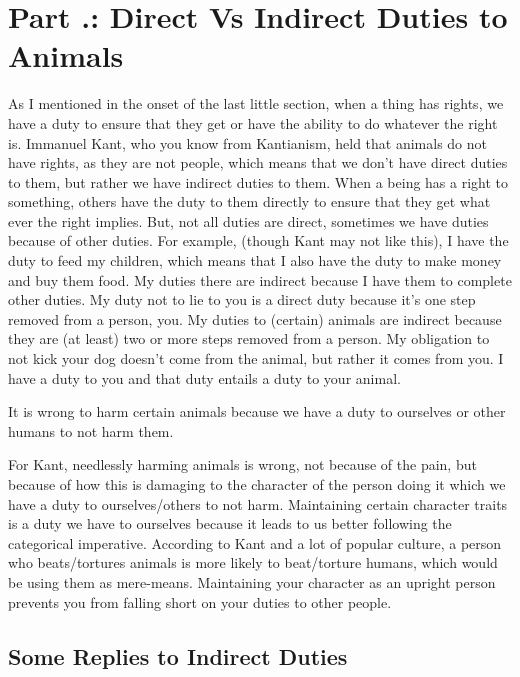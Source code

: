 \section{Part \thechapcount.\theseccount: Direct Vs Indirect Duties to Animals}
As I mentioned in the onset of the last little section, when a thing has rights, we have a duty to ensure that they get or have the ability to do whatever the right is. Immanuel Kant, who you know from Kantianism, held that animals do not have rights, as they are not people, which means that we don't have direct duties to them, but rather we have indirect duties to them. When a being has a right to something, others have the duty to them directly  to ensure that they get what ever the right implies. But, not all duties are direct, sometimes we have duties because of other duties. For example, (though Kant may not like this), I have the duty to feed my children, which means that I also have the duty to make money and buy them food. My duties there are indirect because I have them to complete other duties. My duty not to lie to you is a direct duty because it's one step removed from a person, you. My duties to (certain) animals are indirect because they are (at least) two or more steps removed from a person. My obligation to not kick your dog doesn't come from the animal, but rather it comes from you. I have a duty to you and that duty entails a duty to your animal. 

\begin{center}It is wrong to harm certain animals because we have a duty to ourselves or other humans to not harm them.\end{center}

For Kant, needlessly harming animals is wrong, not because of the pain, but because of how this is damaging to the character of the person doing it which we have a duty to ourselves/others to not harm. Maintaining certain character traits is a duty we have to ourselves because it leads to us better following the categorical imperative.  According to Kant and a lot of popular culture, a person who beats/tortures animals is more likely to beat/torture humans, which would be using them as mere-means. Maintaining your character as an upright person prevents you from falling short on your duties to other people.
\subsection{Some Replies to Indirect Duties}

